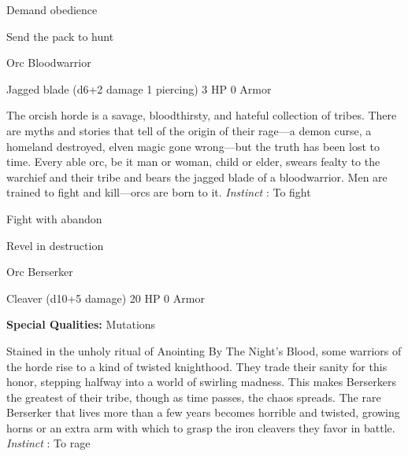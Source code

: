 \startitemize[1,packed]
         
\item Demand obedience

         
\item Send the pack to hunt

       
\stopitemize
       
\startMonsterName
Orc Bloodwarrior	 
\stopMonsterName
       

Jagged blade (d6+2 damage 1 piercing)	3 HP	0 Armor

       


       
\startMonsterDescription
The orcish horde is a savage, bloodthirsty, and hateful collection of tribes. There are myths and stories that tell of the origin of their rage—a demon curse, a homeland destroyed, elven magic gone wrong—but the truth has been lost to time. Every able orc, be it man or woman, child or elder, swears fealty to the warchief and their tribe and bears the jagged blade of a bloodwarrior. Men are trained to fight and kill—orcs are born to it. {\em Instinct} : To fight
\stopMonsterDescription
       
\startitemize[1,packed]
         
\item Fight with abandon

         
\item Revel in destruction

       
\stopitemize
       
\startMonsterName
Orc Berserker	 
\stopMonsterName
       

Cleaver (d10+5 damage)	20 HP	0 Armor

       


       
\startMonsterQualities
         {\bf Special Qualities:}  Mutations
\stopMonsterQualities
       
\startMonsterDescription
Stained in the unholy ritual of Anointing By The Night’s Blood, some warriors of the horde rise to a kind of twisted knighthood. They trade their sanity for this honor, stepping halfway into a world of swirling madness. This makes Berserkers the greatest of their tribe, though as time passes, the chaos spreads. The rare Berserker that lives more than a few years becomes horrible and twisted, growing horns or an extra arm with which to grasp the iron cleavers they favor in battle. {\em Instinct} : To rage
\stopMonsterDescription
       
